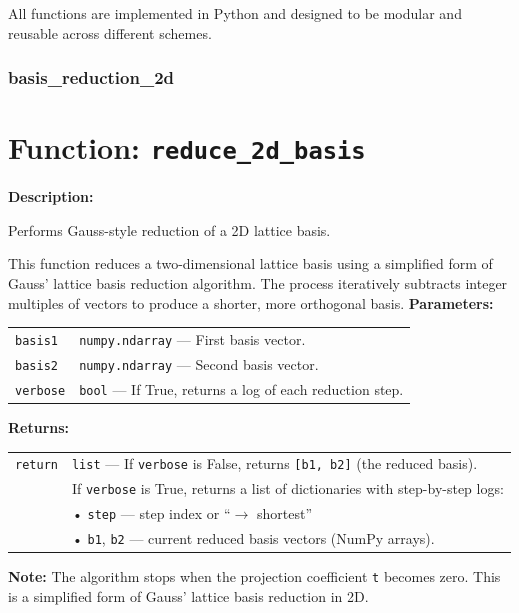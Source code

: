 \documentclass[a4paper,12pt]{article}
\begin{document}
All functions are implemented in Python and designed to be modular and reusable across different schemes.
\subsubsection{basis\_reduction\_2d}

\section*{Function: \texttt{reduce\_2d\_basis}}

\textbf{Description:}

Performs Gauss-style reduction of a 2D lattice basis.

This function reduces a two-dimensional lattice basis using a simplified form
of Gauss' lattice basis reduction algorithm. The process iteratively subtracts
integer multiples of vectors to produce a shorter, more orthogonal basis.
\vspace{1em}
\noindent
\textbf{Parameters:}

\vspace{0.5em}
\begin{tabular}{p{3cm} p{11cm}}
\texttt{basis1} & \texttt{numpy.ndarray} — First basis vector. \\
\texttt{basis2} & \texttt{numpy.ndarray} — Second basis vector. \\
\texttt{verbose} & \texttt{bool} — If True, returns a log of each reduction step. \\
\end{tabular}

\vspace{1em}
\noindent
\textbf{Returns:}

\vspace{0.5em}
\begin{tabular}{p{3cm} p{11cm}}
\texttt{return} & \texttt{list} — If \texttt{verbose} is False, returns \texttt{[b1, b2]} (the reduced basis).\\
                & If \texttt{verbose} is True, returns a list of dictionaries with step-by-step logs:\\
                & \quad • \texttt{step} — step index or ``$\rightarrow$ shortest''\\
                & \quad • \texttt{b1}, \texttt{b2} — current reduced basis vectors (NumPy arrays).\\
\end{tabular}

\vspace{1em}
\noindent
\textbf{Note:}  
The algorithm stops when the projection coefficient \texttt{t} becomes zero.  
This is a simplified form of Gauss’ lattice basis reduction in 2D.
\end{document}
